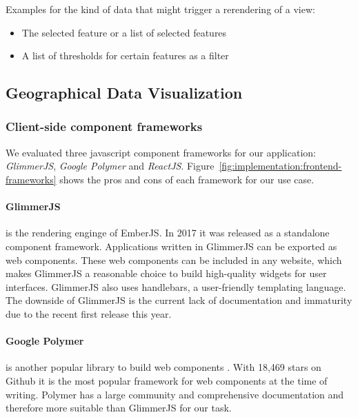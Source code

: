 Examples for the kind of data that might trigger a rerendering of a view:
\begin{itemize}
  \item
    The selected feature or a list of selected features
  \item
    A list of thresholds for certain features as a filter
\end{itemize}
\subsection{Geographical Data Visualization}



\subsubsection{Client-side component frameworks}

We evaluated three javascript component frameworks for our application: \emph{GlimmerJS}, \emph{Google Polymer} and \emph{ReactJS}.
Figure~\ref{fig:implementation:frontend-frameworks} shows the pros and cons of each framework for our use case.

\paragraph{GlimmerJS} is the rendering enginge of EmberJS\cite{Ember2017}.
In 2017 it was released as a standalone component framework.
Applications written in GlimmerJS can be exported as web components.
These web components can be included in any website, which makes GlimmerJS a reasonable choice to build high-quality widgets for user interfaces.
GlimmerJS also uses handlebars\cite{Handlebars2017}, a user-friendly templating language.
The downside of GlimmerJS is the current lack of documentation and immaturity due to the recent first release this year.

\paragraph{Google Polymer} is another popular library to build web components \cite{Polymer2017}.
With 18,469 stars on Github it is the most popular framework for web components at the time of writing.
Polymer has a large community and comprehensive documentation and therefore more suitable than GlimmerJS for our task.

